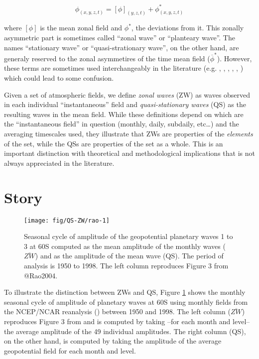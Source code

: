 \documentclass[draft,linenumbers]{agujournal2018}
\begin{document}
\begin{linenomath*}
\begin{equation}\label{eq:Z}
\phi_{(x, y, z, t)} = [\phi]_{(y, z, t)} + \phi_{(x, y, z, t)}^*
\end{equation}
\end{linenomath*}

where \([\phi]\) is the mean zonal field and \(\phi^*\), the deviations
from it. This zonally asymmetric part is sometimes called ``zonal wave''
or ``planteary wave''. The names ``stationary wave'' or
``quasi-strationary wave'', on the other hand, are generaly reserved to
the zonal asymmetires of the time mean field (\(\overline{\phi}^*\)).
However, these terms are sometimes used interchangeably in the
literature (e.g. \citet{Rao2004}, \citet{Raphael2004},
\citet{Kravchenko2012}, \citet{Irving2015}, \citet{Turner2017},
\citet{Lastovicka2018}) which could lead to some confusion.

Given a set of atmospheric fields, we define \emph{zonal waves} (ZW) as
waves observed in each individual ``instantaneous'' field and
\emph{quasi-stationary waves} (QS) as the resulting waves in the mean
field. While these definitions depend on which are the ``instantaneous
field'' in question (monthly, daily, subdaily, etc\ldots{}) and the
averaging timescales used, they illustrate that ZWs are properties of
the \emph{elements} of the set, while the QSs are properties of the set
as a whole. This is an important distinction with theoretical and
methodological implications that is not always appreciated in the
literature.

\section{Story}

\begin{figure}[h]

{\centering \texttt{[image: fig/QS-ZW/rao-1]} 

}

\caption{Seasonal cycle of amplitude of the geopotential planetary waves 1 to 3 at 60\degree S computed as the mean amplitude of the monthly waves ($\overline{ZW}$) and as the amplitude of the mean wave (QS). The period of analysis is 1950 to 1998. The left column reproduces Figure 3 from @Rao2004.}\label{fig:rao}
\end{figure}

To illustrate the distinction between ZWs and QS, Figure \ref{fig:rao}
shows the monthly seasonal cycle of amplitude of planetary waves at
60\degree S using monthly fields from the NCEP/NCAR reanalysis
(\citet{Kalnay1996}) between 1950 and 1998. The left column
(\(\overline{ZW}\)) reproduces Figure 3 from \citet{Rao2004} and is
computed by taking --for each month and level-- the average amplitude of
the 49 individual amplitudes. The right column (QS), on the other hand,
is computed by taking the amplitude of the average geopotential field
for each month and level.
\end{document}

